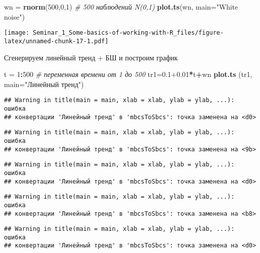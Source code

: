 \documentclass[
]{article}
\newenvironment{Shaded}{\begin{snugshade}}{\end{snugshade}}
\newcommand{\AttributeTok}[1]{\textcolor[rgb]{0.13,0.29,0.53}{#1}}
\newcommand{\CommentTok}[1]{\textcolor[rgb]{0.56,0.35,0.01}{\textit{#1}}}
\newcommand{\DecValTok}[1]{\textcolor[rgb]{0.00,0.00,0.81}{#1}}
\newcommand{\FloatTok}[1]{\textcolor[rgb]{0.00,0.00,0.81}{#1}}
\newcommand{\FunctionTok}[1]{\textcolor[rgb]{0.13,0.29,0.53}{\textbf{#1}}}
\newcommand{\NormalTok}[1]{#1}
\newcommand{\OtherTok}[1]{\textcolor[rgb]{0.56,0.35,0.01}{#1}}
\newcommand{\SpecialCharTok}[1]{\textcolor[rgb]{0.81,0.36,0.00}{\textbf{#1}}}
\newcommand{\StringTok}[1]{\textcolor[rgb]{0.31,0.60,0.02}{#1}}
\begin{document}
\begin{Shaded}
\begin{Highlighting}[]
\NormalTok{wn }\OtherTok{=} \FunctionTok{rnorm}\NormalTok{(}\DecValTok{500}\NormalTok{,}\DecValTok{0}\NormalTok{,}\DecValTok{1}\NormalTok{) }\CommentTok{\# 500 наблюдений N(0,1) }
\FunctionTok{plot.ts}\NormalTok{(wn, }\AttributeTok{main=}\StringTok{"White noise"}\NormalTok{)}
\end{Highlighting}
\end{Shaded}

\texttt{[image: Seminar\_1\_Some-basics-of-working-with-R\_files/figure-latex/unnamed-chunk-17-1.pdf]}

Сгенерируем линейный тренд + БШ и построим график

\begin{Shaded}
\begin{Highlighting}[]
\NormalTok{t }\OtherTok{=} \DecValTok{1}\SpecialCharTok{:}\DecValTok{500} \CommentTok{\# переменная времени от 1 до 500}
\NormalTok{tr1}\OtherTok{=}\FloatTok{0.1+0.01}\SpecialCharTok{*}\NormalTok{t}\SpecialCharTok{+}\NormalTok{wn}
\FunctionTok{plot.ts}\NormalTok{ (tr1, }\AttributeTok{main=}\StringTok{"Линейный тренд"}\NormalTok{)}
\end{Highlighting}
\end{Shaded}

\begin{verbatim}
## Warning in title(main = main, xlab = xlab, ylab = ylab, ...): ошибка
## конвертации 'Линейный тренд' в 'mbcsToSbcs': точка заменена на <d0>
\end{verbatim}

\begin{verbatim}
## Warning in title(main = main, xlab = xlab, ylab = ylab, ...): ошибка
## конвертации 'Линейный тренд' в 'mbcsToSbcs': точка заменена на <9b>
\end{verbatim}

\begin{verbatim}
## Warning in title(main = main, xlab = xlab, ylab = ylab, ...): ошибка
## конвертации 'Линейный тренд' в 'mbcsToSbcs': точка заменена на <d0>
\end{verbatim}

\begin{verbatim}
## Warning in title(main = main, xlab = xlab, ylab = ylab, ...): ошибка
## конвертации 'Линейный тренд' в 'mbcsToSbcs': точка заменена на <b8>
\end{verbatim}

\begin{verbatim}
## Warning in title(main = main, xlab = xlab, ylab = ylab, ...): ошибка
## конвертации 'Линейный тренд' в 'mbcsToSbcs': точка заменена на <d0>
\end{verbatim}
\end{document}
